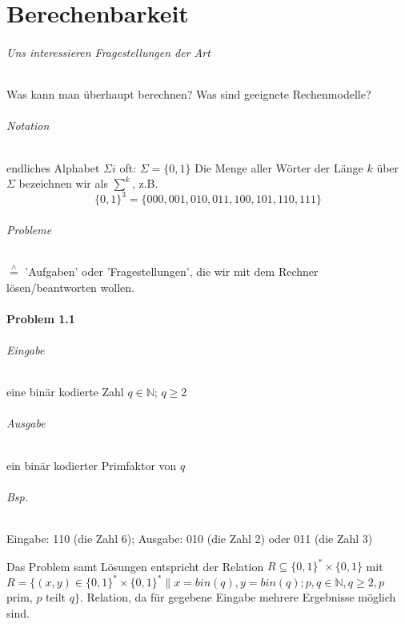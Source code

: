 \part{Berechenbarkeit}

\paragraph*{Uns interessieren Fragestellungen der Art} Was kann man überhaupt berechnen? Was sind geeignete Rechenmodelle?

\paragraph*{Notation} endliches Alphabet $\Sigma i$ oft: $\Sigma = \{ 0,1 \}$ Die Menge aller Wörter der Länge $k$ über $\Sigma$ bezeichnen wir als $\sum\limits^k$, z.B.  $$ \{ 0,1 \}^3 = \{ 000,001,010,011,100,101,110,111 \} $$

\paragraph*{Probleme} $\overset{\wedge}{=}$ 'Aufgaben' oder 'Fragestellungen', die wir mit dem Rechner lösen/beantworten wollen.


\subsection*{Problem 1.1}
\paragraph*{Eingabe} eine binär kodierte Zahl $q \in \mathbb{N}$; $q \geq 2$

\paragraph*{Ausgabe} ein binär kodierter Primfaktor von $q$

\paragraph*{Bsp.} Eingabe: 110 (die Zahl 6); Ausgabe: 010 (die Zahl 2) oder 011 (die Zahl 3)

\par\medskip
Das Problem samt Lösungen entspricht der Relation $R \subseteq \{ 0,1 \}^* \times \{ 0,1 \}$ mit $R=\{ (x,y) \in \{ 0,1 \}^* \times \{ 0,1 \}^* \| x=bin(q), y=bin(q); p,q \in \mathbb{N}, q \geq 2, p$ prim, $p$ teilt $q \}$. Relation, da für gegebene Eingabe mehrere Ergebnisse möglich sind.
\par\medskip

